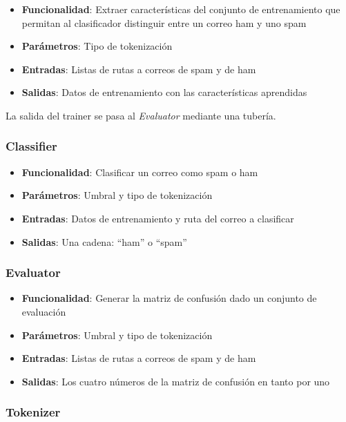 \begin{itemize}
	\item \textbf{Funcionalidad}: Extraer características del conjunto de
		entrenamiento que permitan al clasificador distinguir entre un
		correo ham y uno spam
	\item \textbf{Parámetros}: Tipo de tokenización
	\item \textbf{Entradas}: Listas de rutas a correos de spam y de ham
	\item \textbf{Salidas}: Datos de entrenamiento con las características
		aprendidas
\end{itemize}

La salida del trainer se pasa al \textit{Evaluator} mediante una tubería.

\subsubsection{Classifier}

\begin{itemize}
	\item \textbf{Funcionalidad}: Clasificar un correo como spam o ham
	\item \textbf{Parámetros}: Umbral y tipo de tokenización
	\item \textbf{Entradas}: Datos de entrenamiento y ruta del correo a
		clasificar
	\item \textbf{Salidas}: Una cadena: ``ham'' o ``spam''
\end{itemize}

\subsubsection{Evaluator}

\begin{itemize}
	\item \textbf{Funcionalidad}: Generar la matriz de confusión dado un
		conjunto de evaluación
	\item \textbf{Parámetros}: Umbral y tipo de tokenización
	\item \textbf{Entradas}: Listas de rutas a correos de spam y de ham
	\item \textbf{Salidas}: Los cuatro números de la matriz de confusión en
		tanto por uno
\end{itemize}

\subsubsection{Tokenizer}

